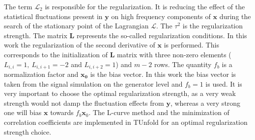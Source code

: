 
The term $\mathcal{L}_{2}$ is responsible for the regularization. It is reducing the effect of the statistical fluctuations present in $\mathbf{y}$ on high frequency
components of $\mathbf{x}$ during the search of the stationary point of the Lagrangian $\mathcal{L}$. The $\tau^{2}$ is the regularization strength. 
The matrix $\mathbf{L}$ represents the so-called regularization conditions. In this work the regularization of the second derivative of $\mathbf{x}$ is performed. 
This corresponds to the initialization of $\mathbf{L}$ matrix with three non-zero elements ($L_{i,i} = 1,\:L_{i,i+1} = -2$ and $L_{i,i+2} = 1$) and $m-2$ rows.
The quantity $f_{b}$ is a normalization 
factor and $\mathbf{x_{0}}$ is the bias vector. In this work the bias vector is taken from the signal simulation on the generator level
and $f_{b} = 1$ is used. It is very important to choose 
the optimal regularization strength, as a very weak strength would not damp the fluctuation effects from $\mathbf{y}$, whereas a very strong 
one will bias $\mathbf{x}$ towards $f_{b}\mathbf{x}_{0}$. The L-curve method \cite{Hansen00thel-curve} and the minimization
of correlation coefficients \cite{VBlobelT} are implemented in TUnfold for an optimal regularization strength choice. 

